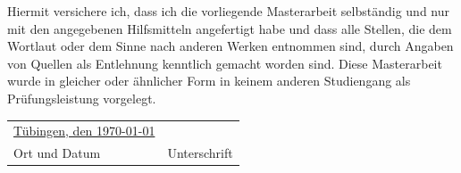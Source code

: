 \documentclass[12pt,twoside]{reedthesis}
\begin{document}
  \begin{declaration}
    Hiermit versichere ich, dass ich die vorliegende Masterarbeit selbständig und nur mit den angegebenen Hilfsmitteln angefertigt habe und dass alle Stellen, die dem Wortlaut oder dem Sinne nach anderen Werken entnommen sind, durch Angaben von Quellen als Entlehnung kenntlich gemacht worden sind. Diese Masterarbeit wurde in gleicher oder ähnlicher Form in keinem anderen Studiengang als Prüfungsleistung vorgelegt.

    \vspace{2cm}
    \begin{tabular}{@{}p{}p{}@{}}
      \underline{\quad Tübingen, den \today \quad} & \underline{\hspace{6cm}} \\
      Ort und Datum & Unterschrift
    \end{tabular}
    \newline
  \end{declaration}
\end{document}
